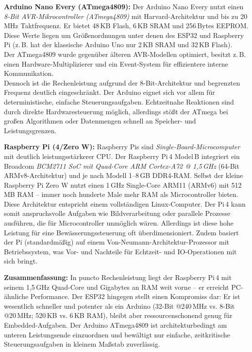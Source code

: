 \noindent\textbf{Arduino Nano Every (ATmega4809):} Der Arduino Nano Every nutzt einen \textit{8-Bit AVR-Mikrocontroller (ATmega4809)} mit Harvard-Architektur und bis zu 20\,MHz Taktfrequenz. Er bietet 48\,KB Flash, 6\,KB SRAM und 256\,Bytes EEPROM. \autocite{atmega_datasheet} Diese Werte liegen um Größenordnungen unter denen des ESP32 und Raspberry Pi (z.\,B. hat der klassische Arduino Uno nur 2\,KB SRAM und 32\,KB Flash). \autocite{greenhous_comparison}
\\
Der ATmega4809 wurde gegenüber älteren AVR-Modellen optimiert, besitzt z.\,B. einen Hardware-Multiplizierer und ein Event-System für effizientere interne Kommunikation. \autocite{atmega_datasheet}
\\
Dennoch ist die Rechenleistung aufgrund der 8-Bit-Architektur und begrenzten Frequenz deutlich eingeschränkt. Der Arduino eignet sich vor allem für deterministische, einfache Steuerungsaufgaben. Echtzeitnahe Reaktionen sind durch direkte Hardwaresteuerung möglich, allerdings stößt der ATmega bei großen Algorithmen oder Datenmengen schnell an Speicher- und Leistungsgrenzen. \autocite{esp32_comparison}

\vspace{5mm}

\noindent\textbf{Raspberry Pi (4/Zero W):} Raspberry Pis sind \textit{Single-Board-Microcomputer} mit deutlich leistungsstärkerer CPU. Der Raspberry Pi\,4 Model\,B integriert ein Broadcom \textit{BCM2711 SoC mit Quad-Core ARM Cortex-A72 @ 1{,}5\,GHz} (64-Bit ARMv8-Architektur) und je nach Modell 1–8\,GB DDR4-RAM. \autocite{raspberry_pi_datasheet}
Selbst der kleine Raspberry Pi Zero W nutzt einen 1\,GHz Single-Core ARM11 (ARMv6) mit 512\,MB RAM \autocite{raspberry_pi_w_datasheet} – immer noch hunderte Male mehr RAM als Microcontroller bieten. \autocite{esp32_comparison}
\\
Diese Architektur entspricht einem vollständigen Linux-Computer. Der Pi\,4 kann somit anspruchsvolle Aufgaben wie Bildverarbeitung oder parallele Prozesse ausführen, die für Microcontroller unmöglich wären. \autocite{esp32_comparison} Allerdings ist diese hohe Leistung für eine Bewässerungssteuerung oft überdimensioniert. Zudem basiert der Pi (standardmäßig) auf einem Von-Neumann-Architektur-Prozessor mit Betriebssystem, was Vor- und Nachteile für Echtzeit- und IO-Operationen mit sich bringt.

\vspace{5mm}

\noindent\textbf{Zusammenfassung:} In puncto Rechenleistung liegt der Raspberry Pi\,4 mit seinem 1{,}5\,GHz Quad-Core und Gigabytes an RAM weit vorne – er erreicht PC-ähnliche Performance. \autocite{esp32_comparison} Der ESP32 hingegen stellt einen Kompromiss dar: Er ist wesentlich schneller und potenter als ein Arduino (32-Bit @240\,MHz vs. 8-Bit @20\,MHz; 520\,KB vs. 6\,KB RAM), bleibt aber ressourcenschonend genug für Embedded-Aufgaben. \autocite{greenhous_comparison} \autocite{atmega_datasheet} Der Arduino ATmega4809 ist architekturbedingt am unteren Leistungsende einzuordnen und bewältigt nur einfache, zeitkritische Steuerungsaufgaben in kleinem Maßstab zuverlässig.


